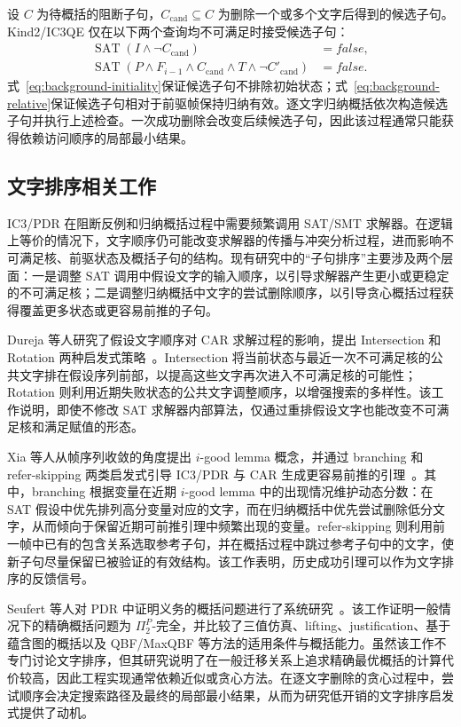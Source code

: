 \documentclass[11pt,a4paper]{article}
\newcommand{\Sat}{\operatorname{SAT}}
\begin{document}
设 $C$ 为待概括的阻断子句，$C_{\mathrm{cand}}\subseteq C$ 为删除一个或多个文字后得到的候选子句。Kind2/IC3QE 仅在以下两个查询均不可满足时接受候选子句：
\begin{align}
  \Sat\!\left(I\land\neg C_{\mathrm{cand}}\right)
    &=\mathit{false}, \label{eq:background-initiality}\\
  \Sat\!\left(P\land F_{i-1}\land C_{\mathrm{cand}}\land T\land
    \neg C'_{\mathrm{cand}}\right)
    &=\mathit{false}. \label{eq:background-relative}
\end{align}
式~\eqref{eq:background-initiality}保证候选子句不排除初始状态；式~\eqref{eq:background-relative}保证候选子句相对于前驱帧保持归纳有效。逐文字归纳概括依次构造候选子句并执行上述检查。一次成功删除会改变后续候选子句，因此该过程通常只能获得依赖访问顺序的局部最小结果。

\subsection{文字排序相关工作}

IC3/PDR 在阻断反例和归纳概括过程中需要频繁调用 SAT/SMT 求解器。在逻辑上等价的情况下，文字顺序仍可能改变求解器的传播与冲突分析过程，进而影响不可满足核、前驱状态及概括子句的结构。现有研究中的“子句排序”主要涉及两个层面：一是调整 SAT 调用中假设文字的输入顺序，以引导求解器产生更小或更稳定的不可满足核；二是调整归纳概括中文字的尝试删除顺序，以引导贪心概括过程获得覆盖更多状态或更容易前推的子句。

Dureja 等人研究了假设文字顺序对 CAR 求解过程的影响，提出 Intersection 和 Rotation 两种启发式策略~\cite{dureja2020intersection}。Intersection 将当前状态与最近一次不可满足核的公共文字排在假设序列前部，以提高这些文字再次进入不可满足核的可能性；Rotation 则利用近期失败状态的公共文字调整顺序，以增强搜索的多样性。该工作说明，即使不修改 SAT 求解器内部算法，仅通过重排假设文字也能改变不可满足核和满足赋值的形态。

Xia 等人从帧序列收敛的角度提出 $i$-good lemma 概念，并通过 branching 和 refer-skipping 两类启发式引导 IC3/PDR 与 CAR 生成更容易前推的引理~\cite{xia2023igood}。其中，branching 根据变量在近期 $i$-good lemma 中的出现情况维护动态分数：在 SAT 假设中优先排列高分变量对应的文字，而在归纳概括中优先尝试删除低分文字，从而倾向于保留近期可前推引理中频繁出现的变量。refer-skipping 则利用前一帧中已有的包含关系选取参考子句，并在概括过程中跳过参考子句中的文字，使新子句尽量保留已被验证的有效结构。该工作表明，历史成功引理可以作为文字排序的反馈信号。

Seufert 等人对 PDR 中证明义务的概括问题进行了系统研究~\cite{seufert2022generalization}。该工作证明一般情况下的精确概括问题为 $\Pi_2^P$-完全，并比较了三值仿真、lifting、justification、基于蕴含图的概括以及 QBF/MaxQBF 等方法的适用条件与概括能力。虽然该工作不专门讨论文字排序，但其研究说明了在一般迁移关系上追求精确最优概括的计算代价较高，因此工程实现通常依赖近似或贪心方法。在逐文字删除的贪心过程中，尝试顺序会决定搜索路径及最终的局部最小结果，从而为研究低开销的文字排序启发式提供了动机。
\end{document}
